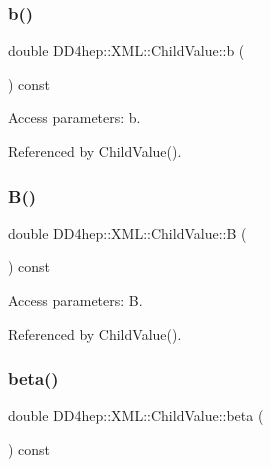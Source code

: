 \subsubsection{\texorpdfstring{b()}{b()}}
{\footnotesize\ttfamily double D\+D4hep\+::\+X\+M\+L\+::\+Child\+Value\+::b (\begin{DoxyParamCaption}{ }\end{DoxyParamCaption}) const}



Access parameters\+: b. 



Referenced by Child\+Value().

\hypertarget{struct_d_d4hep_1_1_x_m_l_1_1_child_value_aac32a15204468c6e0b2167573da2f4e1}{}\label{struct_d_d4hep_1_1_x_m_l_1_1_child_value_aac32a15204468c6e0b2167573da2f4e1} 
\subsubsection{\texorpdfstring{B()}{B()}}
{\footnotesize\ttfamily double D\+D4hep\+::\+X\+M\+L\+::\+Child\+Value\+::B (\begin{DoxyParamCaption}{ }\end{DoxyParamCaption}) const}



Access parameters\+: B. 



Referenced by Child\+Value().

\hypertarget{struct_d_d4hep_1_1_x_m_l_1_1_child_value_a959e9977e7811b7c8603c2885194917b}{}\label{struct_d_d4hep_1_1_x_m_l_1_1_child_value_a959e9977e7811b7c8603c2885194917b} 
\subsubsection{\texorpdfstring{beta()}{beta()}}
{\footnotesize\ttfamily double D\+D4hep\+::\+X\+M\+L\+::\+Child\+Value\+::beta (\begin{DoxyParamCaption}{ }\end{DoxyParamCaption}) const}



